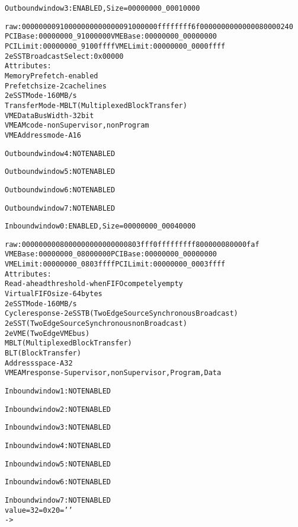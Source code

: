 \documentclass[11pt,a4paper]{article}
\begin{document}
\begin{framed}
\begin{alltt}
Outbound window 3: ENABLED,  Size = 00000000_00010000

raw: 00000000 91000000 00000000 91000000 ffffffff 6f000000 00000000 80000240
PCI Base:  00000000_91000000    VME Base:  00000000_00000000
PCI Limit: 00000000_9100ffff    VME Limit: 00000000_0000ffff
     2eSST Broadcast Select: 0x00000
     Attributes:
        Memory Prefetch      - enabled
        Prefetch size        - 2 cache lines
        2eSST Mode           - 160 MB/s
        Transfer Mode        - MBLT (Multiplexed Block Transfer)
        VME Data Bus Width   - 32 bit
        VME AM code          - nonSupervisor, nonProgram
        VME Address mode     - A16



Outbound window 4: NOT ENABLED


Outbound window 5: NOT ENABLED


Outbound window 6: NOT ENABLED


Outbound window 7: NOT ENABLED

Inbound window 0: ENABLED,  Size = 00000000_00040000

raw: 00000000 08000000 00000000 0803fff0 ffffffff f8000000 80000faf
VME Base:  00000000_08000000    PCI Base:  00000000_00000000
VME Limit: 00000000_0803ffff    PCI Limit: 00000000_0003ffff
     Attributes:
        Read-ahead threshold - when FIFO competely empty
        Virtual FIFO size    - 64 bytes
        2eSST Mode           - 160 MB/s
        Cycle response       - 2eSSTB (Two Edge Source Synchronous Broadcast)
                               2eSST (Two Edge Source Synchronous nonBroadcast)
                               2eVME (Two Edge VMEbus)
                               MBLT (Multiplexed Block Transfer)
                               BLT (Block Transfer)
        Address space        - A32
        VME AM response      - Supervisor, nonSupervisor, Program, Data



Inbound window 1: NOT ENABLED


Inbound window 2: NOT ENABLED


Inbound window 3: NOT ENABLED


Inbound window 4: NOT ENABLED


Inbound window 5: NOT ENABLED


Inbound window 6: NOT ENABLED


Inbound window 7: NOT ENABLED
value = 32 = 0x20 = ' '
-> 
\end{alltt}
\end{framed}
\end{document}
